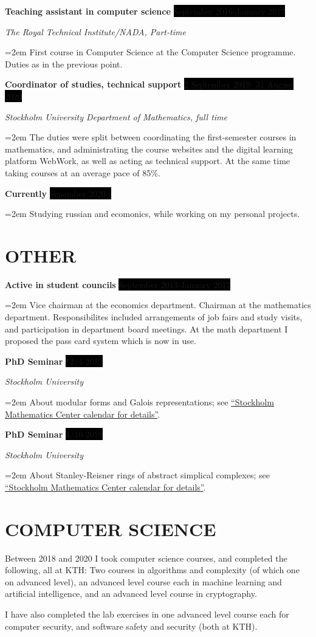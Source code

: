 \documentclass[paper=a4,fontsize=11pt]{scrartcl} %
\newcommand{\NewPart}[1]{\section*{\uppercase{#1}}}
\newcommand{\EducationEntry}[4]{
		\noindent \textbf{#1} \hfill      %
		\colorbox{Black}{%
			\parbox{6em}{%
			\hfill\color{White}#2}} \par  %
		\noindent \textit{#3} \par        %
		\noindent\hangindent=2em\hangafter=0 \small #4 %
		\normalsize \par}
\newcommand{\WorkEntry}[4]{				  %
		\noindent \textbf{#1} \hfill      %
		\colorbox{Black}{\color{White}#2} \par  %
		\noindent \textit{#3} \par              %
		\noindent\hangindent=2em\hangafter=0 \small #4 %
		\normalsize \par}
\begin{document}
\WorkEntry{Teaching assistant in computer science}{September 2016-January 2017}{The Royal Technical Institute/NADA, Part-time}{First course in Computer Science at the Computer Science programme. Duties as in the previous point.}

\WorkEntry{Coordinator of studies, technical support}{2 September 2019- 31 August 2020}{Stockholm University Department of Mathematics, full time}{The duties were split between coordinating the first-semester courses in mathematics, and administrating the course websites and the digital learning platform WebWork, as well as acting as technical support. At the same time taking courses at an average pace of 85\%.}

\WorkEntry{Currently}{Sepember 2020 - }{}{Studying russian and ecomonics, while working on my personal projects.}

\NewPart{Other}

\WorkEntry{Active in student councils}{September 2013-January 2017}{}{Vice chairman at the economics department. Chairman at the mathematics department. Responsibilites included arrangements of job fairs and study visits, and participation in department board meetings. At the math department I proposed the pass card system which is now in use.}

\WorkEntry{PhD Seminar}{12/4-2019}{Stockholm University}{About modular forms and Galois representations; see \href{https://www.math-stockholm.se/kalender/johann-selewa-modular-forms-and-galois-representations-1.894047}{``Stockholm Mathematics Center calendar for details''}.}

\WorkEntry{PhD Seminar}{4/10-2019}{Stockholm University}{About Stanley-Reisner rings of abstract simplical complexes; see \href{https://www.math-stockholm.se/kalender/johann-selewa-stanley-reisner-rings-of-abstract-simplicial-complexes-1.927681}{``Stockholm Mathematics Center calendar for details''}.}




\NewPart{Computer Science}{}

Between 2018 and 2020 I took computer science courses, and completed the following, all at KTH:  Two courses in algorithms and complexity (of which one on advanced level),  an advanced level course each in machine learning and artificial intelligence, and an advanced level course in cryptography.

I have also completed the lab exercises in one advanced level course each for computer security, and software safety and security (both at KTH).
\end{document}
